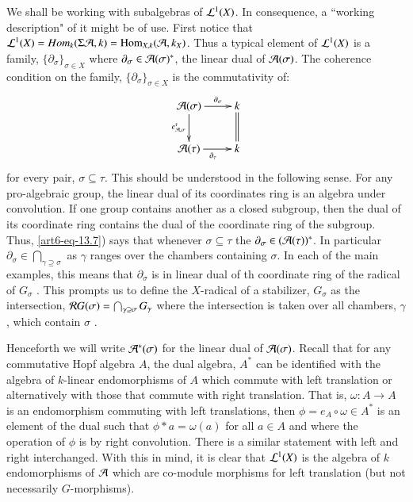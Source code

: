We shall be working with subalgebras of $\mathcal{L}^{1}(X)$. In consequence, a ``working description" of it might be of use. First notice that $\mathcal{L}^{1}(X) = Hom_{k}(\Sigma \mathcal{A}, k) = \operatorname{Hom}_{X, k}(\mathcal{A}, k_{X})$. Thus a typical element of $\mathcal{L}^{1}(X)$ is a family, $\{\partial_{\sigma}\}_{\sigma \in X}$ where $\partial_{\sigma} \in \mathcal{A}(\sigma)^{*}$, the linear dual of $\mathcal{A}(\sigma)$. The coherence condition on the family, $\{\partial_{\sigma}\}_{\sigma \in X}$ is the commutativity of:
\begin{equation}\label{art6-eq-13.7}
\vcenter{
\xymatrix{
\calA(\sigma) \ar[d]_-{e_{\calA, \sigma}^{\tau}} \ar[r]^-{\partial_{\sigma}} & k \ar@{=}[d]\\
\calA(\tau) \ar[r]_{\partial_{\tau}} & k
}}
\end{equation}
for every pair, $\sigma \subseteq \tau$. This should be understood in the following sense. For any pro-algebraic group, the linear dual of its coordinates ring is an algebra under convolution. If one group contains another as a closed subgroup, then the dual of its coordinate ring contains the dual of the coordinate ring of the subgroup. Thus,
\ref{art6-eq-13.7}) says that whenever $\sigma \subseteq \tau$ the $\partial_{\sigma} \in (\mathcal{A}(\tau))^{*}$. In particular $\partial_{\sigma} \in \bigcap_{\gamma \supseteq \sigma}$ as $\gamma$ ranges over the chambers containing $\sigma$. In each of the main examples, this means that $\partial_{\sigma}$ is in linear dual of th coordinate ring of the radical of $G_{\sigma}$ . This prompts us to define the $X$-radical of a stabilizer, $G_{\sigma}$ as the intersection, $\mathcal{R} G(\sigma) = \bigcap_{\gamma \supseteq \sigma}G_{\gamma}$ where the intersection is taken over all chambers, $\gamma$, which contain $\sigma$ .

Henceforth we will write $\mathcal{A}^{*}(\sigma)$ for the linear dual of $\mathcal{A}(\sigma)$. Recall that for any commutative Hopf algebra $A$, the dual algebra, $A^{*}$ can be identified with the algebra of $k$-linear endomorphisms of $A$ which commute with left translation or alternatively with those that commute with right translation. That is, $\omega : A\rightarrow A$ is an endomorphism commuting with left translations, then $\phi = e_{A} \circ \omega \in A^{*}$ is an element of the dual such that $\phi * a = \omega (a)$ for all $a\in A$ and where the operation of $\phi$ is by right convolution. There is a similar statement with left and right interchanged. With this in mind, it is clear that $\mathcal{L}^{1}(X)$ is the algebra of $k$ endomorphisms of $\mathcal{A}$ which are co-module morphisms for left translation (but not necessarily $G$-morphisms).

